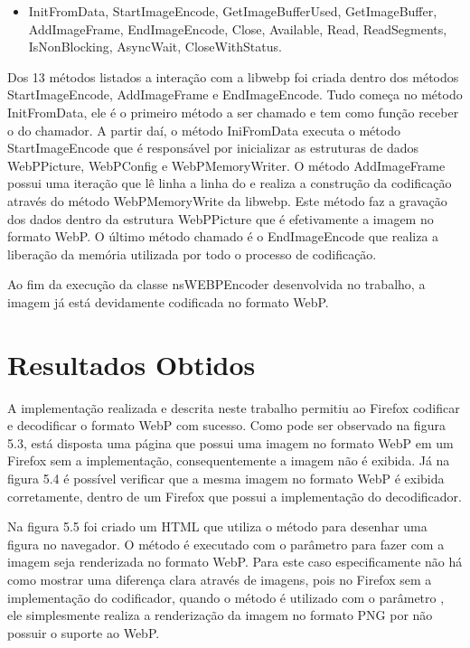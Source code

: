 \documentclass[espaco=simples,appendix=Name]{abnt}
\begin{document}
\begin{itemize}
	\item InitFromData, StartImageEncode, GetImageBufferUsed, GetImageBuffer, AddImageFrame, EndImageEncode, Close, Available, Read, ReadSegments, IsNonBlocking, AsyncWait, CloseWithStatus.
\end{itemize}

Dos 13 métodos listados a interação com a libwebp foi criada dentro dos métodos StartImageEncode, AddImageFrame e EndImageEncode. Tudo começa no método InitFromData, ele é o primeiro método a ser chamado e tem como função receber o  do chamador. A partir daí, o método IniFromData executa o método StartImageEncode que é responsável por inicializar as estruturas de dados WebPPicture, WebPConfig e WebPMemoryWriter. O método AddImageFrame possui uma iteração que lê linha a linha do  e realiza a construção da codificação através do método WebPMemoryWrite da libwebp. Este método faz a gravação dos dados dentro da estrutura WebPPicture que é efetivamente a imagem no formato WebP. O último método chamado é o EndImageEncode que realiza a liberação da memória utilizada por todo o processo de codificação.

Ao fim da execução da classe nsWEBPEncoder desenvolvida no trabalho, a imagem já está devidamente codificada no formato WebP.

\section{Resultados Obtidos}

A implementação realizada e descrita neste trabalho permitiu ao Firefox codificar e decodificar o formato WebP com sucesso. Como pode ser observado na figura 5.3, está disposta uma página que possui uma imagem no formato WebP em um Firefox sem a implementação, consequentemente a imagem não é exibida. Já na figura 5.4 é possível verificar que a mesma imagem no formato WebP é exibida corretamente, dentro de um Firefox que possui a implementação do decodificador. 

Na figura 5.5 foi criado um HTML que utiliza o método  para desenhar uma figura no navegador. O método  é executado com o parâmetro  para fazer com a imagem seja renderizada no formato WebP. Para este caso especificamente não há como mostrar uma diferença clara através de imagens, pois no Firefox sem a implementação do codificador, quando o método  é utilizado com o parâmetro , ele simplesmente realiza a renderização da imagem no formato PNG por não possuir o suporte ao WebP. 
\end{document}
